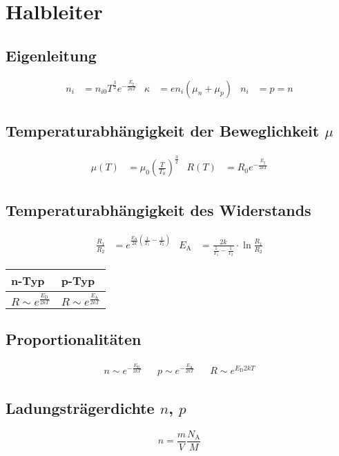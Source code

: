 \chapter{Halbleiter}
	\section{Eigenleitung}
		\begin{align*}
			n_i &= n_{i0}T^{\frac{3}{2}}e^{-\frac{E_\text{g}}{2kT}} & \kappa &=en_i(\mu_n+\mu_p) & n_i &= p=n
		\end{align*}
	
	\section{Temperaturabhängigkeit der Beweglichkeit $\mu$}
		\begin{align*}
			\mu(T) &= \mu_0\left(\frac{T}{T_0}\right)^{\frac{3}{2}} & R(T) &= R_0e^{-\frac{E_{\text{g}}}{2kT}}
		\end{align*}
	
	\section{Temperaturabhängigkeit des Widerstands}
		\begin{align*}
			\frac{R_1}{R_2}&=e^{\frac{E_{\mathrm{A}}}{2k}\left(\frac{1}{T_1}-\frac{1}{T_2}\right)} 
			& E_{\mathrm{A}}&=\frac{2k}{\frac{1}{T_1}-\frac{1}{T_2}}\cdot\ln\frac{R_1}{R_2}
		\end{align*}
		\begin{table}[h]
		\begin{tabular}{ll}
		n-Typ & p-Typ\\
		\toprule
		$R\sim e^{\frac{E_{\mathrm{D}}}{2kT}}$ & $R\sim e^{\frac{E_{\mathrm{A}}}{2kT}}$\\
		\end{tabular}
		\end{table}

	\section{Proportionalitäten}
		\begin{align*}
			n\sim e^{-\frac{E_{\mathrm{D}}}{2kT}} && p\sim e^{-\frac{E_{\mathrm{A}}}{2kT}} && R\sim e^{E_{\mathrm{D}}{2kT}}
		\end{align*}

	\section{Ladungsträgerdichte $n$, $p$}
		\[
			n=\frac{m}{V}\frac{N_\text{A}}{M}
		\]

